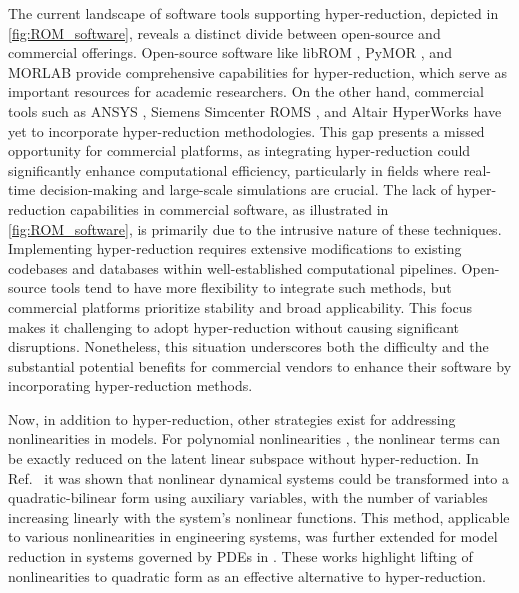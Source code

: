\documentclass[11pt]{article}
\begin{document}
The current landscape of software tools supporting hyper-reduction, depicted in \cref{fig:ROM_software}, reveals a distinct divide between open-source and commercial offerings.
Open-source software like libROM \cite{Choi2019libROM}, PyMOR \cite{milk2016pymor}, and MORLAB \cite{BenW21c} provide comprehensive capabilities for hyper-reduction, which serve as important resources for academic researchers.
On the other hand, commercial tools such as ANSYS \cite{asgari2014application,pliuhin2023implementation}, Siemens Simcenter ROMS \cite{Siemens2021simcenterd}, and Altair HyperWorks \cite{lindqvist2022method} have yet to incorporate hyper-reduction methodologies.
This gap presents a missed opportunity for commercial platforms, as integrating hyper-reduction could significantly enhance computational efficiency, particularly in fields where real-time decision-making and large-scale simulations are crucial.
The lack of hyper-reduction capabilities in commercial software, as illustrated in \cref{fig:ROM_software}, is primarily due to the intrusive nature of these techniques.
Implementing hyper-reduction requires extensive modifications to existing codebases and databases within well-established computational pipelines.
Open-source tools tend to have more flexibility to integrate such methods, but commercial platforms prioritize stability and broad applicability.
This focus makes it challenging to adopt hyper-reduction without causing significant disruptions.
Nonetheless, this situation underscores both the difficulty and the substantial potential benefits for commercial vendors to enhance their software by incorporating hyper-reduction methods.


Now, in addition to hyper-reduction, other strategies exist for addressing nonlinearities in models.
For polynomial nonlinearities \cite{ghattas2021learning}, the nonlinear terms can be exactly reduced on the latent linear subspace without hyper-reduction.
In Ref.~\cite{gu2011qlmor} it was shown that nonlinear dynamical systems could be transformed into a quadratic-bilinear form using auxiliary variables, with the number of variables increasing linearly with the system's nonlinear functions.
This method, applicable to various nonlinearities in engineering systems, was further extended for model reduction in systems governed by PDEs in \cite{benner2015two-sided,kramer2019nonlinear,kramer2021balanced}.
These works highlight lifting of nonlinearities to quadratic form as an effective alternative to hyper-reduction.
\end{document}
